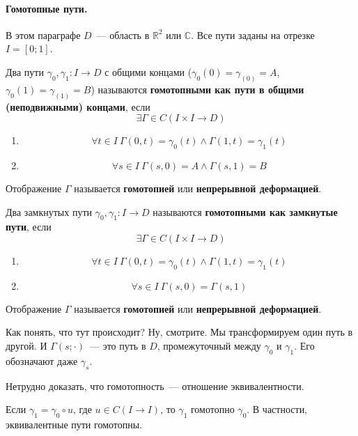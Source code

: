 \documentclass{article}
\begin{document}
    \paragraph{Гомотопные пути.}
    \begin{remark}
        В этом параграфе $D$~--- область в $\mathbb R^2$ или $\mathbb C$. Все пути заданы на отрезке $I=[0;1]$.
    \end{remark}
    \begin{definition}
        Два пути $\gamma_0,\gamma_1\colon I\to D$ с общими концами ($\gamma_0(0)=\gamma_(0)=A$, $\gamma_0(1)=\gamma_(1)=B$) называются \textbf{гомотопными как пути в общими (неподвижными) концами}, если
        $$
        \exists\Gamma\in C(I\times I\to D)
        $$
        \begin{enumerate}
            \item $$\forall t\in I~\Gamma(0,t)=\gamma_0(t)\land\Gamma(1,t)=\gamma_1(t)$$
            \item $$\forall s\in I~\Gamma(s,0)=A\land\Gamma(s,1)=B$$
        \end{enumerate}
        Отображение $\Gamma$ называется \textbf{гомотопией} или \textbf{непрерывной деформацией}.
    \end{definition}
    \begin{definition}
        Два замкнутых пути $\gamma_0,\gamma_1\colon I\to D$ называются \textbf{гомотопными как замкнутые пути}, если
        $$
        \exists\Gamma\in C(I\times I\to D)
        $$
        \begin{enumerate}
            \item $$\forall t\in I~\Gamma(0,t)=\gamma_0(t)\land\Gamma(1,t)=\gamma_1(t)$$
            \item $$\forall s\in I~\Gamma(s,0)=\Gamma(s,1)$$
        \end{enumerate}
        Отображение $\Gamma$ называется \textbf{гомотопией} или \textbf{непрерывной деформацией}.
    \end{definition}
    \begin{remark}
        Как понять, что тут происходит? Ну, смотрите. Мы трансформируем один путь в другой. И $\Gamma(s;\cdot)$~--- это путь в $D$, промежуточный между $\gamma_0$ и $\gamma_1$. Его обозначают даже $\gamma_s$.
    \end{remark}
    \begin{claim}
        Нетрудно доказать, что гомотопность~--- отношение эквивалентности.
    \end{claim}
    \begin{claim}
        Если $\gamma_1=\gamma_0\circ u$, где $u\in C(I\to I)$, то $\gamma_1$ гомотопно $\gamma_0$. В частности, эквивалентные пути гомотопны.
    \end{claim}
\end{document}
